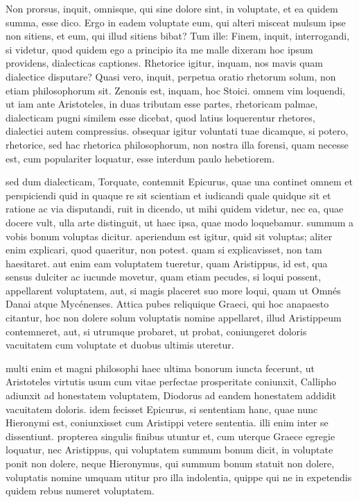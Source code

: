  Non prorsus, inquit, omnisque, qui sine dolore sint, in voluptate, et ea quidem summa, esse dico. Ergo in eadem voluptate eum, qui alteri misceat mulsum ipse non sitiens, et eum, qui illud sitiens bibat? Tum ille: Finem, inquit, interrogandi, si videtur, quod quidem ego a principio ita me malle dixeram hoc ipsum providens, dialecticas captiones. Rhetorice igitur, inquam, nos mavis quam dialectice disputare? Quasi vero, inquit, perpetua oratio rhetorum solum, non etiam philosophorum sit. Zenonis est, inquam, hoc Stoici. omnem vim loquendi, ut iam ante Aristoteles, in duas tributam esse partes, rhetoricam palmae, dialecticam pugni similem esse dicebat, quod latius loquerentur rhetores, dialectici autem compressius. obsequar igitur voluntati tuae dicamque, si potero, rhetorice, sed hac rhetorica philosophorum, non nostra illa forensi, quam necesse est, cum populariter loquatur, esse interdum paulo hebetiorem.

 sed dum dialecticam, Torquate, contemnit Epicurus, quae una continet omnem et perspiciendi quid in quaque re sit scientiam et iudicandi quale quidque sit et ratione ac via disputandi, ruit in dicendo, ut mihi quidem videtur, nec ea, quae docere vult, ulla arte distinguit, ut haec ipsa, quae modo loquebamur. summum a vobis bonum voluptas dicitur. aperiendum est igitur, quid sit voluptas; aliter enim explicari, quod quaeritur, non potest. quam si explicavisset, non tam haesitaret. aut enim eam voluptatem tueretur, quam Aristippus, id est, qua sensus dulciter ac iucunde movetur, quam etiam pecudes, si loqui possent, appellarent voluptatem, aut, si magis placeret suo more loqui, quam ut Omnés Danai atque Mycénenses. Attica pubes reliquique Graeci, qui hoc anapaesto citantur, hoc non dolere solum voluptatis nomine appellaret, illud Aristippeum contemneret, aut, si utrumque probaret, ut probat, coniungeret doloris vacuitatem cum voluptate et duobus ultimis uteretur.

 multi enim et magni philosophi haec ultima bonorum iuncta fecerunt, ut Aristoteles virtutis usum cum vitae perfectae prosperitate coniunxit, Callipho adiunxit ad honestatem voluptatem, Diodorus ad eandem honestatem addidit vacuitatem doloris. idem fecisset Epicurus, si sententiam hanc, quae nunc Hieronymi est, coniunxisset cum Aristippi vetere sententia. illi enim inter se dissentiunt. propterea singulis finibus utuntur et, cum uterque Graece egregie loquatur, nec Aristippus, qui voluptatem summum bonum dicit, in voluptate ponit non dolere, neque Hieronymus, qui summum bonum statuit non dolere, voluptatis nomine umquam utitur pro illa indolentia, quippe qui ne in expetendis quidem rebus numeret voluptatem.

